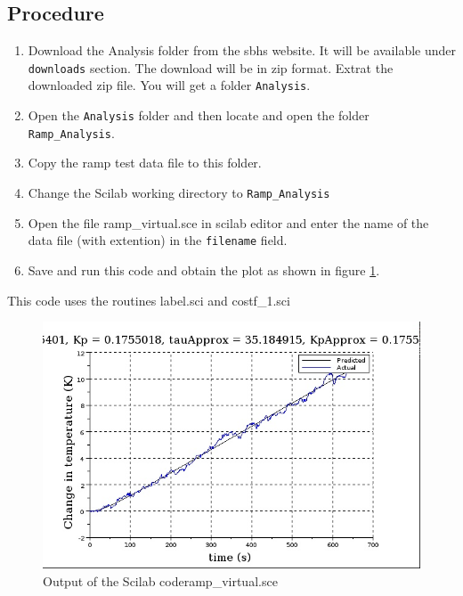 \subsection{Procedure}
\begin{enumerate}
\item Download the Analysis folder from the sbhs website. It will be available under {\tt downloads} section. The download will be in zip format. Extrat the downloaded zip file. You will get a folder {\tt Analysis}. 
\item Open the {\tt Analysis} folder and then locate and open the folder {\tt Ramp\_Analysis}.
 \item Copy the ramp test data file to this folder.
 \item Change the Scilab working directory to  {\tt Ramp\_Analysis}
 \item Open the file {\ttfamily ramp\_virtual.sce} in scilab editor and enter the name of the data file (with extention) in the {\tt filename} field. 
\item Save and run this code and obtain the plot as shown in figure \ref{firstorder_ramp}. 
\end{enumerate}
This code uses the routines {\ttfamily label.sci} and {\ttfamily costf\_1.sci}

\begin{figure} 
\centering
\includegraphics[width=\linewidth]{Ramp-test_manual/ramp_analysis.jpg}
\caption{Output of the Scilab code{\ttfamily ramp\_virtual.sce}}
\label{firstorder_ramp}
\end{figure} \label{firstorderplot}

